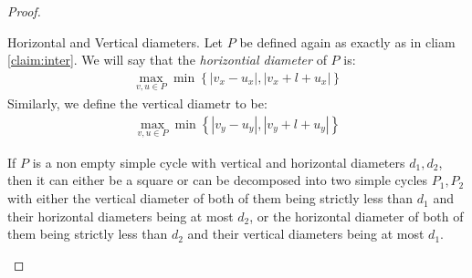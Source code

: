 \begin{proof}
\begin{figure}[h]
\end{figure}

  \begin{definition}
    Horizontal and Vertical diameters. Let $P$ be defined again as exactly as in cliam \cref{claim:inter}. We will say that the \textit{horizontial diameter} of $P$ is: 
    \begin{equation*}
      \begin{split}
        \max_{v,u\in P} \min{ \left\{  | v_{x} -u_{x}|, |v_{x} + l + u_{x}| \right\} }  
      \end{split}
    \end{equation*}
    Similarly, we define the vertical diametr to be: 
    \begin{equation*}
      \begin{split}
        \max_{v,u\in P} \min{ \left\{  | v_{y} -u_{y}|, |v_{y} + l + u_{y}| \right\} }  
      \end{split}
    \end{equation*}
  \end{definition}

  \begin{claim} \label{claim:reduce}
If $P$ is a non empty simple cycle with vertical and horizontal diameters $d_{1}, d_{2}$, then it can either be a square or can be decomposed into two simple cycles $P_{1},P_{2}$ with either the vertical diameter of both of them being strictly less than $d_{1}$ and their horizontal diameters being at most $d_{2}$, or the horizontal diameter of both of them being strictly less than $d_{2}$ and their vertical diameters being at most $d_{1}$.
  \end{claim}


\end{proof}
